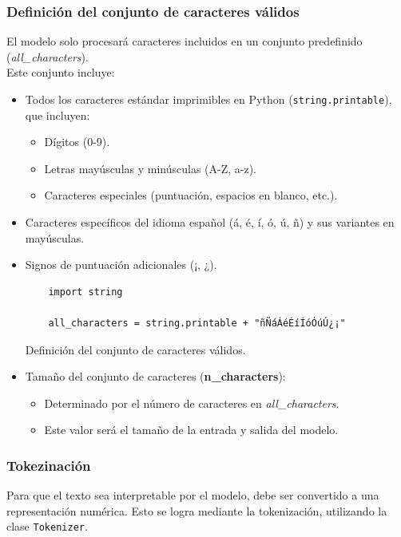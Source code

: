 \documentclass{article}
\begin{document}
\subsubsection{Definición del conjunto de caracteres válidos}
El modelo solo procesará caracteres incluidos en un conjunto predefinido (\textit{all\_characters}). \\
Este conjunto incluye:
\begin{itemize}
    \item Todos los caracteres estándar imprimibles en Python (\texttt{string.printable}), que incluyen:
    \begin{itemize}
        \item Dígitos (0-9).
        \item Letras mayúsculas y minúsculas (A-Z, a-z).
        \item Caracteres especiales (puntuación, espacios en blanco, etc.).
    \end{itemize}
    \item Caracteres específicos del idioma español (á, é, í, ó, ú, ñ) y sus variantes en mayúsculas.
    \item  Signos de puntuación adicionales (¡, ¿).
    \begin{listing}[H]
    \begin{verbatim}
    import string

    all_characters = string.printable + "ñÑáÁéÉíÍóÓúÚ¿¡"
    \end{verbatim}
    \caption{Definición del conjunto de caracteres válidos.}
    \end{listing}
    \item Tamaño del conjunto de caracteres (\textbf{n\_characters}):
    \begin{itemize}
        \item Determinado por el número de caracteres en \textit{all\_characters}.
        \item Este valor será el tamaño de la entrada y salida del modelo.
    \end{itemize}
\end{itemize}

\newpage

\subsubsection{Tokezinación}
Para que el texto sea interpretable por el modelo, debe ser convertido a una representación numérica. Esto se logra mediante la tokenización, utilizando la clase \texttt{Tokenizer}. \\
\end{document}
